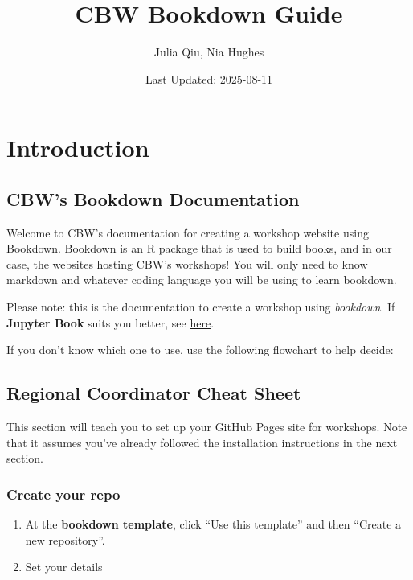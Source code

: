 \documentclass[
]{book}
\title{CBW Bookdown Guide}
\author{Julia Qiu, Nia Hughes}
\date{Last Updated: 2025-08-11}
\begin{document}
\maketitle

{
\setcounter{tocdepth}{1}
\tableofcontents
}
\part{Introduction}\label{part-introduction}

\chapter{CBW's Bookdown Documentation}\label{cbws-bookdown-documentation}

Welcome to CBW's documentation for creating a workshop website using Bookdown. Bookdown is an R package that is used to build books, and in our case, the websites hosting CBW's workshops! You will only need to know markdown and whatever coding language you will be using to learn bookdown.

Please note: this is the documentation to create a workshop using \emph{bookdown}. If \textbf{Jupyter Book} suits you better, see \href{https://cbw-dev.github.io/jupyterbook-docs/}{here}.

If you don't know which one to use, use the following flowchart to help decide:

\chapter{Regional Coordinator Cheat Sheet}\label{regional-coordinator-cheat-sheet}

This section will teach you to set up your GitHub Pages site for workshops. Note that it assumes you've already followed the installation instructions in the next section.

\section{Create your repo}\label{create-your-repo}

\begin{enumerate}
\def\labelenumi{\arabic{enumi}.}
\item
  At the \textbf{bookdown template}, click ``Use this template'' and then ``Create a new repository''.
\item
  Set your details
\end{enumerate}
\end{document}
